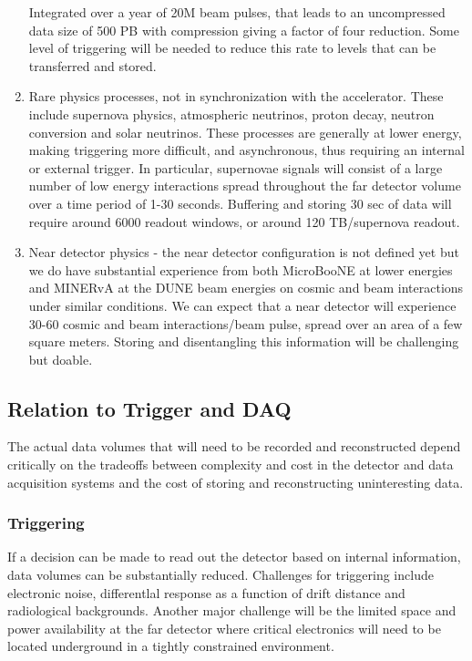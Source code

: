 \begin{enumerate}
Integrated over a year of 20M beam pulses, that leads to an uncompressed data size of 500 PB with compression giving a factor of four reduction. Some level of triggering will be needed to reduce this rate to levels that can be transferred and stored.


\item Rare physics processes, not in synchronization with the accelerator.  These include supernova physics, atmospheric neutrinos, proton decay, neutron conversion and solar neutrinos.  These processes are generally at lower energy, making triggering more difficult, and asynchronous, thus requiring an internal or external trigger.  In particular, supernovae signals will consist of a large number of low energy interactions spread throughout the far detector volume over a time period of 1-30 seconds. Buffering and storing 30 sec of data will require around 6000 readout windows, or around 120 TB/supernova readout.  

\item Near detector physics - the near detector configuration is not defined yet but we do have substantial experience from both MicroBooNE at lower energies and MINERvA at the DUNE beam energies on cosmic and beam interactions under similar conditions.  We can expect that a near detector will experience 30-60 cosmic and beam interactions/beam pulse, spread over an area of a few square meters.  Storing and disentangling this information will be challenging but doable. 

\end{enumerate}


\subsection{Relation to Trigger and DAQ}

The actual data volumes that will need to be recorded and reconstructed depend critically on the tradeoffs between complexity and cost in the detector and data acquisition systems and the cost of storing and reconstructing uninteresting data.

\subsubsection{Triggering}

If a decision can be made to read  out the detector based on internal information, data volumes can be substantially reduced.  
Challenges for triggering include electronic noise, differentlal response as a function of drift distance and radiological backgrounds.
Another major challenge will be the limited space and power availability at the far detector where critical electronics will need to be located underground in a tightly constrained environment.

